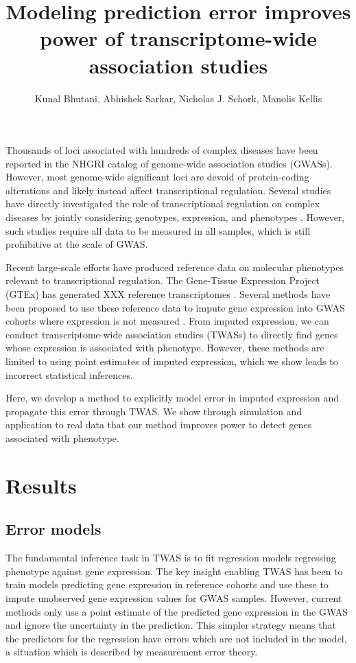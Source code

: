 \documentclass{article}
\author{Kunal Bhutani, Abhishek Sarkar, Nicholas J. Schork, Manolis Kellis}
\date{}
\title{Modeling prediction error improves power of transcriptome-wide association studies}
\begin{document}
\maketitle

Thousands of loci associated with hundreds of complex diseases have been
reported in the NHGRI catalog of genome-wide association studies
\cite{10.1093/nar/gkt1229} (GWASs). However, most genome-wide significant loci
are devoid of protein-coding alterations \cite{10.1073/pnas.0903103106} and
likely instead affect transcriptional regulation. Several studies have directly
investigated the role of transcriptional regulation on complex diseases by
jointly considering genotypes, expression, and phenotypes \cite{xxx}. However,
such studies require all data to be measured in all samples, which is still
prohibitive at the scale of GWAS.

Recent large-scale efforts have produced reference data on molecular phenotypes
relevant to transcriptional regulation. The Gene-Tissue Expression Project
(GTEx) has generated XXX reference transcriptomes
\cite{10.1126/science.1262110}. Several methods have been proposed to use these
reference data to impute gene expression into GWAS cohorts where expression is
not measured \cite{10.1038/ng.3367,10.1101/024083}. From imputed expression, we
can conduct transcriptome-wide association studies (TWASs) to directly find
genes whose expression is associated with phenotype. However, these methods
are limited to using point estimates of imputed expression, which we show leads
to incorrect statistical inferences.

Here, we develop a method to explicitly model error in imputed expression and
propagate this error through TWAS. We show through simulation and application
to real data that our method improves power to detect genes associated with
phenotype.

\section{Results}

\subsection{Error models}

The fundamental inference task in TWAS is to fit regression models regressing
phenotype against gene expression. The key insight enabling TWAS has been to
train models predicting gene expression in reference cohorts and use these to
impute unobserved gene expression values for GWAS samples. However, current
methods only use a point estimate of the predicted gene expression in the GWAS
and ignore the uncertainty in the prediction. This simpler strategy means that
the predictors for the regression have errors which are not included in the
model, a situation which is described by measurement error theory.
\end{document}
